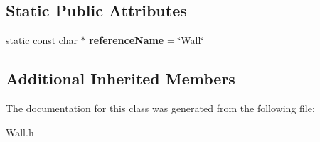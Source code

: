 \subsection*{Static Public Attributes}
\begin{DoxyCompactItemize}
\item 
\hypertarget{class_arena_1_1_wall_a2f6c9b13b85c3d9e5819c3fffcd0d8ab}{static const char $\ast$ {\bfseries reference\+Name} = \char`\"{}Wall\char`\"{}}\label{class_arena_1_1_wall_a2f6c9b13b85c3d9e5819c3fffcd0d8ab}

\end{DoxyCompactItemize}
\subsection*{Additional Inherited Members}


The documentation for this class was generated from the following file\+:\begin{DoxyCompactItemize}
\item 
Wall.\+h\end{DoxyCompactItemize}

